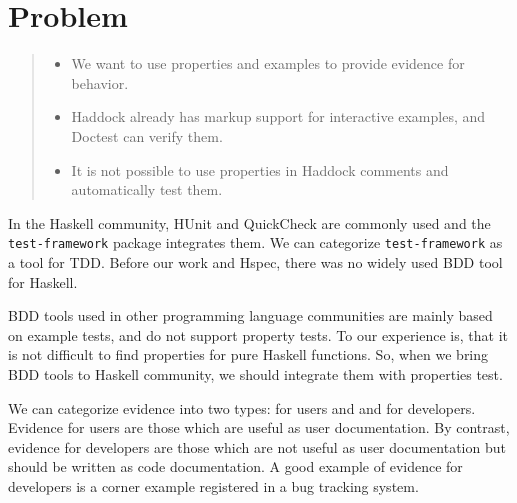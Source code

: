 \documentclass[preprint]{sigplanconf}
\begin{document}


\section{Problem}

\begin{quote}\begin{itemize}
    \item
        We want to use properties and examples to provide evidence for
        behavior.
    \item
        Haddock already has markup support for interactive examples,
        and Doctest can verify them.
    \item
        It is not possible to use properties in Haddock comments and
        automatically test them.
\end{itemize}\end{quote}

In the Haskell community, HUnit and QuickCheck are commonly used %
and the {\tt test-framework} package integrates them.
We can categorize {\tt test-framework} as
a tool for TDD.
Before our work and Hspec, there was no widely used BDD tool for Haskell.

BDD tools used in other programming language communities are
mainly based on example tests,
and do not support property tests.
To our experience is, that it is not difficult to find properties for
pure Haskell functions.
So, when we bring BDD tools to
Haskell community, we should integrate them with properties test.

We can categorize evidence into two types: for users and
and for developers.
Evidence for users are those which are useful as user documentation.
By contrast, evidence for developers are
those which are not useful as user documentation
but should be written as code documentation.
A good example of evidence for developers
is a corner example registered in a bug tracking system.
\end{document}
